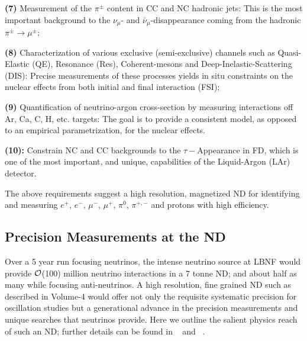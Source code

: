 \vspace{0.25cm} 
\noindent
{\bf (7)} Measurement of the $\pi^{\pm}$ content in 
CC and NC hadronic jets:  This is the most important background to 
the $\nu_\mu$- and $\bar \nu_\mu$-disappearance coming from  the hadronic   $\pi^{\pm} \rightarrow \mu^{\pm}$; 

\vspace{0.25cm} 
\noindent
{\bf (8)} Characterization of various exclusive (semi-exclusive) 
channels such as Quasi-Elastic (QE), Resonance (Res), 
Coherent-mesons and Deep-Inelastic-Scattering (DIS): 
Precise measurements of these processes yields  
 in situ constraints on the nuclear effects from both initial and final interaction (FSI); 

\vspace{0.25cm} 
\noindent 
{\bf (9)} Quantification of neutrino-argon cross-section 
by measuring interactions off Ar, Ca, C, H, etc. targets: The goal is to provide 
a consistent model, as opposed to an empirical parametrization, for the nuclear effects. 



\vspace{0.25cm} 
\noindent 
{\bf (10):} Constrain NC and CC backgrounds to the {\boldmath $\tau-$}Appearance in FD, 
which is one of the most important, and unique, capabilities of the Liquid-Argon (LAr) detector. 

\noindent
The above requirements suggest a high resolution, magnetized ND for identifying and 
measuring $e^+$, $e^-$, $\mu^-$, $\mu^+$, $\pi^0$, $\pi^{+,-}$ and protons  with high efficiency. 



\subsection{Precision Measurements at the ND} 
\label{sec-nd-sbp} 

\noindent
Over a 5 year run focusing neutrinos,  the intense neutrino source at LBNF would provide 
${\cal {O}}$(100) million neutrino interactions in a 7 tonne ND; 
and about half as many while focusing anti-neutrinos. 
A high resolution, fine grained ND such as described in Volume-4 would offer not only the requisite systematic 
precision for  oscillation studies but a generational advance in the precision measurements and unique 
searches  that neutrinos provide. Here we outline the salient physics reach of such an ND; further details can be 
found in ~\cite{DPR} and ~\cite{LBNE-SCI}. 

